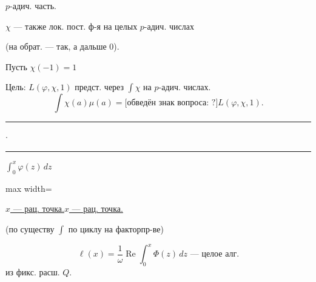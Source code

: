 \documentclass[11pt]{article}
\theoremstyle{definition}
\theoremstyle{remark}
\let\DiplomaticMathUnderline\underline
\renewcommand{\underline}[1]{\ifmmode\DiplomaticMathUnderline{#1}\else\uline{#1}\fi}
\begin{document}
$p$-адич. часть.

$\chi$ — также лок. пост. ф-я на целых $p$-адич. числах

(на обрат. — так, а дальше $0$).

Пусть $\chi(-1)=1$

Цель: $L(\varphi,\chi,1)$ предст. через $\int\chi$ на $p$-адич. числах.
\begin{equation*}
\int\chi(a)\mu(a)=\text{[обведён знак вопроса: ?]}L(\varphi,\chi,1).
\end{equation*}
\begin{center}\rule{1.2cm}{0.3pt}\quad$\cdot$\quad\rule{1cm}{0.3pt}\end{center}

\begin{center}
$\displaystyle\int_0^x\varphi(z)\,dz$
\quad
\begin{adjustbox}{max width=\linewidth}
\end{adjustbox}
\quad\underline{$x$ — рац. точка.}
\end{center}

(по существу $\int$ по циклу на факторпр-ве)

\begin{equation*}
\ell(x)=\frac{1}{\omega}\operatorname{Re}\int_0^x\Phi(z)\,dz
\text{ — целое алг.}
\end{equation*}
из фикс. расш. $Q$.
\end{document}
